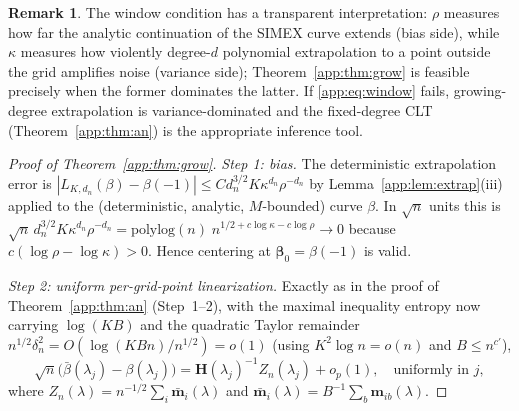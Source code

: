 \documentclass[11pt]{article}
\theoremstyle{plain}
\theoremstyle{definition}
\newtheorem{remark}{Remark}
\newcommand{\bet}{\bm{\beta}}
\begin{document}
\begin{remark}
The window condition has a transparent interpretation: $\rho$ measures
how far the analytic continuation of the SIMEX curve extends (bias
side), while $\kappa$ measures how violently degree-$d$ polynomial
extrapolation to a point outside the grid amplifies noise (variance
side); Theorem~\ref{app:thm:grow} is feasible precisely when the former
dominates the latter. If \eqref{app:eq:window} fails, growing-degree
extrapolation is variance-dominated and the fixed-degree CLT
(Theorem~\ref{app:thm:an}) is the appropriate inference tool.
\end{remark}

\begin{proof}[Proof of Theorem~\ref{app:thm:grow}]
\emph{Step 1: bias.} The deterministic extrapolation error is
$|L_{K,d_n}(\beta)-\beta(-1)|\le C d_n^{3/2}K\kappa^{d_n}\rho^{-d_n}$ by
Lemma~\ref{app:lem:extrap}(iii) applied to the (deterministic, analytic,
$M$-bounded) curve $\beta$. In $\sqrt n$ units this is
$\sqrt n\,d_n^{3/2}K\kappa^{d_n}\rho^{-d_n}
= \mathrm{polylog}(n)\;n^{1/2+c\log\kappa-c\log\rho}\to0$
because $c(\log\rho-\log\kappa)>0$. Hence centering at $\bet_0=\beta(-1)$
is valid.

\emph{Step 2: uniform per-grid-point linearization.} Exactly as in the
proof of Theorem~\ref{app:thm:an} (Step~1--2), with the maximal inequality
entropy now carrying $\log(KB)$ and the quadratic Taylor remainder
$n^{1/2}\delta_n^2=O(\log(KBn)/n^{1/2})=o(1)$ (using
$K^2\log n=o(n)$ and $B\le n^{c'}$),
\[
  \sqrt n\bigl(\bar\beta(\lambda_j)-\beta(\lambda_j)\bigr)
  =\bm H(\lambda_j)^{-1}Z_n(\lambda_j)+o_p(1),
  \quad\text{uniformly in }j,
\]
where $Z_n(\lambda)=n^{-1/2}\sum_i\bar{\bm m}_i(\lambda)$ and
$\bar{\bm m}_i(\lambda)=B^{-1}\sum_b\bm m_{ib}(\lambda)$.


\end{proof}
\end{document}
